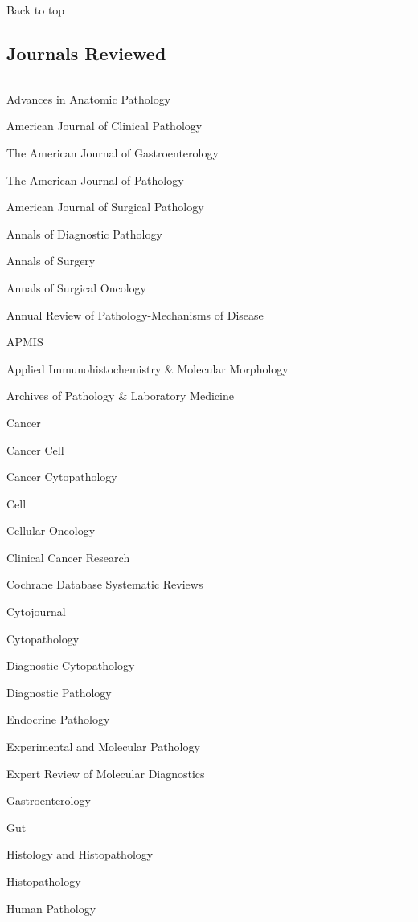 \documentclass[]{article}
\begin{document}
Back to top

\pagebreak

\hypertarget{journals-reviewed}{%
\subsection{Journals Reviewed}\label{journals-reviewed}}

\begin{center}\rule{0.5\linewidth}{\linethickness}\end{center}

Advances in Anatomic Pathology

American Journal of Clinical Pathology

The American Journal of Gastroenterology

The American Journal of Pathology

American Journal of Surgical Pathology

Annals of Diagnostic Pathology

Annals of Surgery

Annals of Surgical Oncology

Annual Review of Pathology-Mechanisms of Disease

APMIS

Applied Immunohistochemistry \& Molecular Morphology

Archives of Pathology \& Laboratory Medicine

Cancer

Cancer Cell

Cancer Cytopathology

Cell

Cellular Oncology

Clinical Cancer Research

Cochrane Database Systematic Reviews

Cytojournal

Cytopathology

Diagnostic Cytopathology

Diagnostic Pathology

Endocrine Pathology

Experimental and Molecular Pathology

Expert Review of Molecular Diagnostics

Gastroenterology

Gut

Histology and Histopathology

Histopathology

Human Pathology
\end{document}
